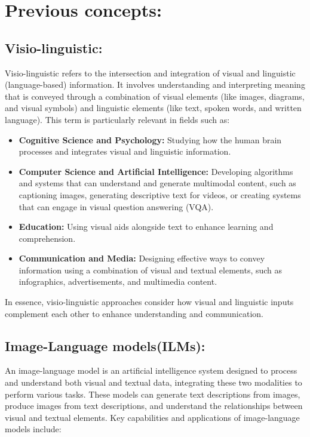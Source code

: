 \section{Previous concepts:}

\subsection{Visio-linguistic:}
Visio-linguistic refers to the intersection and integration of visual and linguistic (language-based) information. It involves understanding and interpreting meaning that is conveyed through a combination of visual elements (like images, diagrams, and visual symbols) and linguistic elements (like text, spoken words, and written language). This term is particularly relevant in fields such as:

\begin{itemize}
\item \textbf{Cognitive Science and Psychology:} Studying how the human brain processes and integrates visual and linguistic information.
\item \textbf{Computer Science and Artificial Intelligence:} Developing algorithms and systems that can understand and generate multimodal content, such as captioning images, generating descriptive text for videos, or creating systems that can engage in visual question answering (VQA).
\item \textbf{Education:} Using visual aids alongside text to enhance learning and comprehension.
\item \textbf{Communication and Media:} Designing effective ways to convey information using a combination of visual and textual elements, such as infographics, advertisements, and multimedia content.
\end{itemize}
In essence, visio-linguistic approaches consider how visual and linguistic inputs complement each other to enhance understanding and communication.

\subsection{Image-Language models(ILMs):} \label{ilm}
An image-language model is an artificial intelligence system designed to process and understand both visual and textual data, integrating these two modalities to perform various tasks. These models can generate text descriptions from images, produce images from text descriptions, and understand the relationships between visual and textual elements. Key capabilities and applications of image-language models include:

